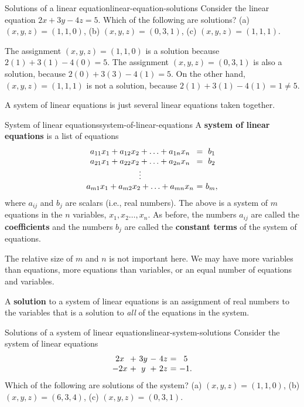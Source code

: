 \begin{example}{Solutions of a linear equation}{linear-equation-solutions}
  Consider the linear equation $2x+3y-4z=5$. Which of the following
  are solutions? (a) $(x,y,z)=(1,1,0)$, (b) $(x,y,z)=(0,3,1)$, (c)
  $(x,y,z)=(1,1,1)$.
\end{example}

\begin{solution}
  The assignment $(x,y,z) = (1,1,0)$ is a solution because
  $2(1)+3(1)-4(0) = 5$. The assignment $(x,y,z) = (0,3,1)$ is also a
  solution, because $2(0) + 3(3) - 4(1) = 5$. On the other hand,
  $(x,y,z) = (1,1,1)$ is not a solution, because
  $2(1) + 3(1)-4(1) = 1 \neq 5$.
\end{solution}

A system of linear equations is just several linear equations taken
together.

\begin{definition}{System of linear equations}{system-of-linear-equations}
  A \textbf{system of linear equations}%
   is a list of equations
  \begin{equation*}
    \begin{array}{c@{~}c@{~}c}
      a_{11}x_1+a_{12}x_2+\ldots+a_{1n}x_n&=&b_1 \\
      a_{21}x_1+a_{22}x_2+\ldots+a_{2n}x_n&=&b_2 \\
      \vdots \\
      a_{m1}x_1+a_{m2}x_2+\ldots+a_{mn}x_n&=&b_m,
    \end{array}
  \end{equation*}
  where $a_{ij}$ and $b_j$ are scalars (i.e., real numbers). The above
  is a system of $m$ equations in the $n$ variables,
  $x_1,x_2\ldots,x_n$.  As before, the numbers $a_{ij}$ are called the
  \textbf{coefficients}%
   and the numbers $b_j$ are called the
  \textbf{constant terms}%
   of the system of equations.
\end{definition}

The relative size of $m$ and $n$ is not important here. We may have
more variables than equations, more equations than variables, or an
equal number of equations and variables.

A \textbf{solution}%
 to a system of linear
equations is an assignment of real numbers to the variables that is a
solution to {\em all} of the equations in the system.

\begin{example}{Solutions of a system of linear equations}{linear-system-solutions}
  Consider the system of linear equations
  \begin{equation*}
    \begin{array}{c@{~}c@{~}c@{~}c@{~}c@{~}c@{~}c}
      2x&+&3y&-&4z &=& 5 \\
      -2x&+&y&+&2z &=& -1.
    \end{array}
  \end{equation*}
  Which of the following are solutions of the system? (a)
  $(x,y,z)=(1,1,0)$, (b) $(x,y,z)=(6,3,4)$, (c) $(x,y,z)=(0,3,1)$.
\end{example}

